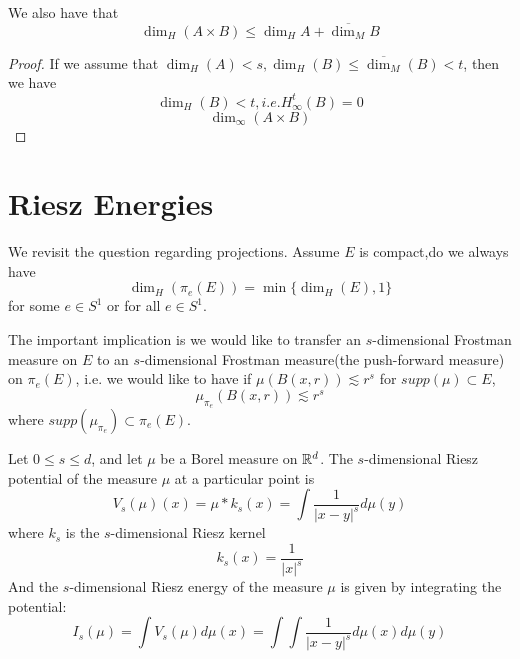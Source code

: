 \begin{corollary}
    We also have that
    \begin{equation*}
        \dim_H(A\times B)\leq\dim_HA+\overline{\dim_M}B
    \end{equation*}
\end{corollary}
\begin{proof}
    If we assume that $\dim_H(A)<s, \dim_H(B)\leq\overline{\dim_M}(B)<t$, then we have
    \begin{equation*}
        \dim_H(B)<t, i.e. H_\infty^t(B)=0
    \end{equation*}
    \begin{equation*}
        \dim_\infty(A\times B)
    \end{equation*}
\end{proof}



\section{Riesz Energies}
We revisit the question regarding projections.
Assume $E$ is compact,do we always have
\begin{equation*}
    \dim_H(\pi_e(E))=\min\{\dim_H(E), 1\}
\end{equation*}
for some $e\in S^1$ or for all $e\in S^1$.

The important implication is we would like to transfer an $s$-dimensional Frostman measure on $E$ to an $s$-dimensional Frostman measure(the push-forward measure) on $\pi_e(E)$, i.e. we would like to have if $\mu(B(x,r))\lesssim r^s$ for $supp(\mu)\subset E$,
\begin{equation*}
    \mu_{\pi_e}(B(x,r))\lesssim r^s
\end{equation*}
where $supp(\mu_{\pi_e})\subset \pi_e(E)$.

\begin{definition}
    Let $0\leq s\leq d$, and let $\mu$ be a Borel measure on $\mathbb{R}^d$. The $s$-dimensional Riesz potential of the measure $\mu$ at a particular point is
    \begin{equation*}
        V_s(\mu)(x)=\mu\ast k_s(x)=\int\frac{1}{|x-y|^s}d\mu(y)
    \end{equation*}
    where $k_s$ is the $s$-dimensional Riesz kernel 
    \begin{equation*}
        k_s(x)=\frac{1}{|x|^s}
    \end{equation*}
    And the $s$-dimensional Riesz energy of the measure $\mu$ is given by integrating the potential:
    \begin{equation*}
        I_s(\mu)=\int V_s(\mu)d\mu(x)=\int\int\frac{1}{|x-y|^s}d\mu(x)d\mu(y)
    \end{equation*}
\end{definition}


